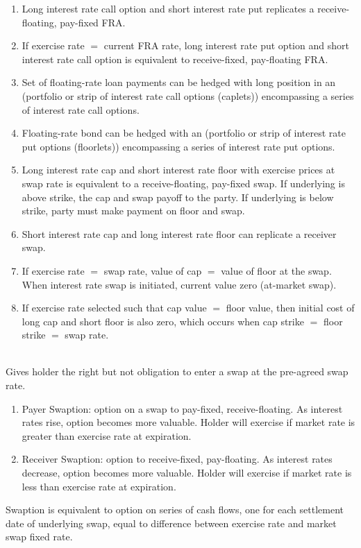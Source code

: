 \begin{remark} 
\begin{enumerate}[label=\roman*.]
\setlength{\itemsep}{0pt}
\item Long interest rate call option and short interest rate put replicates a receive-floating, pay-fixed FRA.
\item If exercise rate $=$ current FRA rate, long interest rate put option and short interest rate call option is equivalent to receive-fixed, pay-floating FRA.
\item Set of floating-rate loan payments can be hedged with long position in an  (portfolio or strip of interest rate call options (caplets)) encompassing a series of interest rate call options.
\item Floating-rate bond can be hedged with an  (portfolio or strip of interest rate put options (floorlets)) encompassing a series of interest rate put options.
\item Long interest rate cap and short interest rate floor with exercise prices at swap rate is equivalent to a receive-floating, pay-fixed swap. If underlying is above strike, the cap and swap payoff to the party. If underlying is below strike, party must make payment on floor and swap.
\item Short interest rate cap and long interest rate floor can replicate a receiver swap.
\item If exercise rate $=$ swap rate, value of cap $=$ value of floor at the swap. When interest rate swap is initiated, current value zero (at-market swap). 
\item If exercise rate selected such that cap value $=$ floor value, then initial cost of long cap and short floor is also zero, which occurs when cap strike $=$ floor strike $=$ swap rate.
\end{enumerate}
\end{remark}

\begin{remark} \\
Gives holder the right but not obligation to enter a swap at the pre-agreed swap rate.
\begin{enumerate}[label=\roman*.]
\setlength{\itemsep}{0pt}
\item Payer Swaption: option on a swap to pay-fixed, receive-floating. As interest rates rise, option becomes more valuable. Holder will exercise if market rate is greater than exercise rate at expiration.
\item Receiver Swaption: option to receive-fixed, pay-floating. As interest rates decrease, option becomes more valuable. Holder will exercise if market rate is less than exercise rate at expiration.
\end{enumerate}
Swaption is equivalent to option on series of cash flows, one for each settlement date of underlying swap, equal to difference between exercise rate and market swap fixed rate.
\end{remark}


